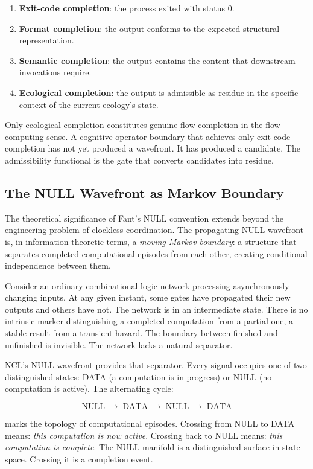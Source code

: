 \documentclass[12pt, a4paper]{article}
\begin{document}
\begin{enumerate}
\item \textbf{Exit-code completion}: the process exited with
  status 0.
\item \textbf{Format completion}: the output conforms to the
  expected structural representation.
\item \textbf{Semantic completion}: the output contains the
  content that downstream invocations require.
\item \textbf{Ecological completion}: the output is admissible
  as residue in the specific context of the current ecology's
  state.
\end{enumerate}

Only ecological completion constitutes genuine flow completion
in the flow computing sense. A cognitive operator boundary that
achieves only exit-code completion has not yet produced a
wavefront. It has produced a candidate. The admissibility
functional is the gate that converts candidates into residue.

\subsection{The NULL Wavefront as Markov Boundary}

The theoretical significance of Fant's NULL convention extends
beyond the engineering problem of clockless coordination. The
propagating NULL wavefront is, in information-theoretic terms,
a \emph{moving Markov boundary}: a structure that separates
completed computational episodes from each other, creating
conditional independence between them.

Consider an ordinary combinational logic network processing
asynchronously changing inputs. At any given instant, some
gates have propagated their new outputs and others have not.
The network is in an intermediate state. There is no intrinsic
marker distinguishing a completed computation from a partial
one, a stable result from a transient hazard. The boundary
between finished and unfinished is invisible. The network lacks
a natural separator.

NCL's NULL wavefront provides that separator. Every signal
occupies one of two distinguished states: DATA (a computation
is in progress) or NULL (no computation is active). The
alternating cycle:

\[
\text{NULL} \;\to\; \text{DATA} \;\to\; \text{NULL} \;\to\; \text{DATA}
\]

marks the topology of computational episodes. Crossing from
NULL to DATA means: \emph{this computation is now active}.
Crossing back to NULL means: \emph{this computation is
complete}. The NULL manifold is a distinguished surface in
state space. Crossing it is a completion event.
\end{document}
